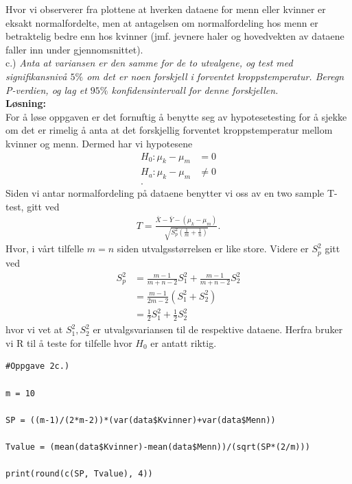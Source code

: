 \documentclass[12pt,
               a4paper,
               article,
               oneside,
               oldfontcommands,
               norsk]{memoir}
\begin{document}
Hvor vi observerer fra plottene at hverken dataene for menn eller kvinner er eksakt normalfordelte, men at antagelsen om normalfordeling hos menn er betraktelig bedre enn hos kvinner (jmf. jevnere haler og hovedvekten av dataene faller inn under gjennomsnittet). \vspace{4mm}\\ 
c.) \emph{Anta at variansen er den samme for de to utvalgene, og test med signifikansnivå $5\%$ om det er noen forskjell i forventet kroppstemperatur. Beregn P-verdien, og lag et $95\%$ konfidensintervall for denne forskjellen.} \vspace{4mm}\\ 
\textbf{Løsning:}\vspace{4mm}\\ 
For å løse oppgaven er det fornuftig å benytte seg av hypotesetesting for å sjekke om det er rimelig å anta at det forskjellig forventet kroppstemperatur mellom kvinner og menn. Dermed har vi hypotesene 
\begin{align*}
  H_{0} : \mu_{k} - \mu_{m} &= 0 \\[5pt]
  H_{a} : \mu_{k} - \mu_{m} &\neq 0 \\[5pt].
\end{align*}
Siden vi antar normalfordeling på dataene benytter vi oss av en two sample T-test, gitt ved 
\begin{align*}
  T = \frac{\bar{X} - \bar{Y} - \left(\mu_{k} - \mu_{m}\right)}{\sqrt{S_{p}^{2} \left(\frac{1}{m} + \frac{1}{n}\right)}}.
\end{align*}
Hvor, i vårt tilfelle $m = n$ siden utvalgsstørrelsen er like store. Videre er $S_{p}^{2}$ gitt ved 
\begin{align*}
  S_{p}^{2} &= \frac{m-1}{m +n - 2}S_{1}^2 +  \frac{m-1}{m +n - 2}S_{2}^2 \\[5pt] 
            &= \frac{m-1}{2m - 2}\left(S_{1}^{2} + {S_{2}^2} \right) \\[5pt]
            &= \frac{1}{2}S_{1}^{2} +\frac{1}{2}S_{2}^{2}
\end{align*}
hvor vi vet at $S_{1}^{2}, S_{2}^2$ er utvalgsvariansen til de respektive dataene. Herfra bruker vi R til å teste for tilfelle hvor $H_{0}$ er antatt riktig.
\begin{lstlisting}
#Oppgave 2c.)

m = 10

SP = ((m-1)/(2*m-2))*(var(data$Kvinner)+var(data$Menn))

Tvalue = (mean(data$Kvinner)-mean(data$Menn))/(sqrt(SP*(2/m)))

print(round(c(SP, Tvalue), 4))
\end{lstlisting}
\end{document}
